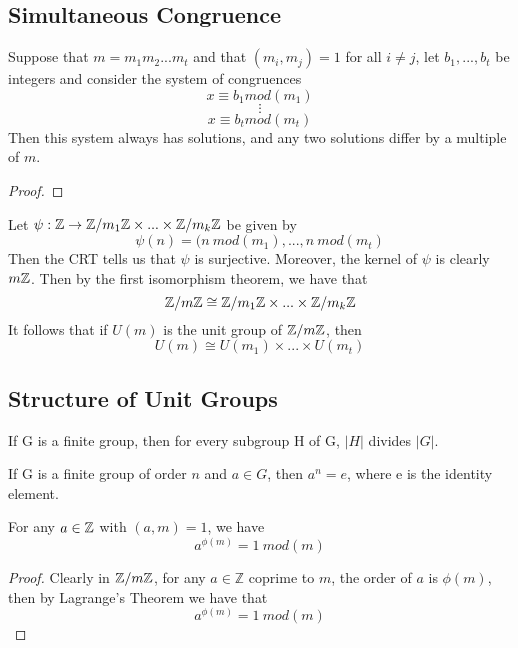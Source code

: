\subsection{Simultaneous Congruence}

\begin{theorem}
Suppose that $m = m_1m_2...m_t$ and that $(m_i, m_j) = 1$ for all $i \neq j$, let $b_1, ..., b_t$ be integers and consider the system of congruences
\[x \equiv b_1 mod(m_1)\]
\[\vdots\]
\[x \equiv b_t mod(m_t)\]
Then this system always has solutions, and any two solutions differ by a multiple of $m$.
\end{theorem}

\begin{proof}

\end{proof}

\begin{remark}
Let $\psi: \mathbb{Z} \to \mathbb{Z}/m_1\mathbb{Z} \times ... \times \mathbb{Z}/m_k \mathbb{Z}$
be given by
\[\psi(n) = (n\ mod(m_1), ..., n\ mod(m_t)\]
Then the CRT tells us that $\psi$ is surjective. Moreover, the kernel of $\psi$ is clearly $m\mathbb{Z}$. Then by the first isomorphism theorem, we have that
\[\mathbb{Z}/m\mathbb{Z} \cong \mathbb{Z}/m_1\mathbb{Z} \times ... \times \mathbb{Z}/m_k \mathbb{Z} \]
It follows that if $U(m)$ is the unit group of $\mathbb{Z}/m\mathbb{Z}$, then
\[U(m) \cong U(m_1) \times ... \times U(m_t)\]
\end{remark}

\subsection{Structure of Unit Groups}

\begin{theorem}
If G is a finite group, then for every subgroup H of G, $|H|$ divides $|G|$.
\end{theorem}

\begin{corollary}
If G is a finite group of order $n$ and $a \in G$, then $a^n = e$, where e is the identity element.
\end{corollary}

\begin{theorem}
For any $a \in \mathbb{Z}$ with $(a, m) = 1$, we have
\[a^{\phi(m)} = 1\ mod(m)\]
\end{theorem}

\begin{proof}
Clearly in $\mathbb{Z}/m\mathbb{Z}$, for any $a \in \mathbb{Z}$ coprime to $m$, the order of $a$ is $\phi(m)$, then by Lagrange's Theorem we have that
\[a^{\phi(m)} = 1\ mod(m)\]
\end{proof}

